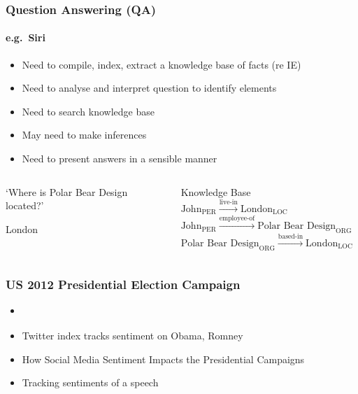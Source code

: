 \begin{frame}
\frametitle{Question Answering (QA)}
\framesubtitle{e.g.~Siri}

\begin{itemize}[<+->]
\item Need to compile, index, extract a knowledge base of facts (re IE)
\item Need to analyse and interpret question to identify elements
\item Need to search knowledge base
\item May need to make inferences
\item Need to present answers in a sensible manner
\end{itemize}

\begin{columns}[T]
\begin{column}{.35\linewidth}
\begin{description}[Q:]
\item[Q:] `Where is Polar Bear Design located?'
\item[A:] London
\end{description}
\end{column}

\pause

\begin{column}{.64\linewidth}
\begin{exampleblock}{Knowledge Base}
	$\text{John}_\text{PER} \xrightarrow{\text{live-in}} \text{London}_\text{LOC}$\\
	$\text{John}_\text{PER} \xrightarrow{\text{employee-of}} \text{Polar Bear Design}_\text{ORG}$\\
	\alert{$\text{Polar Bear Design}_\text{ORG} \xrightarrow{\text{based-in}} \text{London}_\text{LOC}$}
\end{exampleblock}
\end{column}
\end{columns}

\end{frame}


\begin{frame}
\frametitle{US 2012 Presidential Election Campaign}
    
\begin{itemize}
\item {} \parencite{wang2012system}
\item Twitter index tracks sentiment on Obama, Romney \href{http://usatoday30.usatoday.com/news/politics/story/2012-08-01/twitter-political-index/56649678/1}{}
\item How Social Media Sentiment Impacts the Presidential Campaigns \href{http://contently.com/strategist/2012/10/24/social-media-sentiment-becomes-factor-in-presidential-campaigns/}{}
\item Tracking sentiments of a speech \href{http://sentiment.dev.ber.to/}{}
\end{itemize}

\end{frame}


